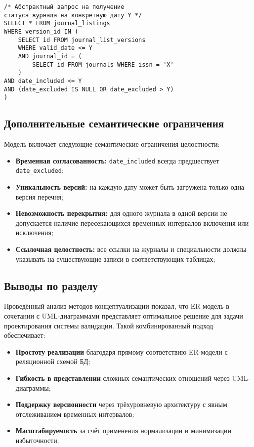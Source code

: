 \begin{verbatim}
/* Абстрактный запрос на получение 
статуса журнала на конкретную дату Y */
SELECT * FROM journal_listings
WHERE version_id IN (
    SELECT id FROM journal_list_versions
    WHERE valid_date <= Y
    AND journal_id = (
        SELECT id FROM journals WHERE issn = 'X'
    )
AND date_included <= Y
AND (date_excluded IS NULL OR date_excluded > Y)
)
\end{verbatim}

\subsection*{Дополнительные семантические ограничения}

Модель включает следующие семантические ограничения целостности:
\begin{itemize} 
	\item \textbf{Временная согласованность:} {\small\texttt{date\_included}} всегда предшествует {\small\texttt{date\_excluded}};
	\item \textbf{Уникальность версий:} на каждую дату может быть загружена только одна версия перечня;
	\item \textbf{Невозможность перекрытия:} для одного журнала в одной версии не допускается наличие пересекающихся временных интервалов включения или исключения;
	\item \textbf{Ссылочная целостность:} все ссылки на журналы и специальности должны указывать на существующие записи в соответствующих таблицах;
\end{itemize}

\subsection{Выводы по разделу}

Проведённый анализ методов концептуализации показал, что ER-модель в сочетании с
UML-диаграммами представляет оптимальное решение для задачи проектирования системы
валидации. Такой комбинированный подход обеспечивает:

\begin{itemize}
	\item \textbf{Простоту реализации} благодаря прямому соответствию ER-модели с реляционной схемой БД;
	\item \textbf{Гибкость в представлении} сложных семантических отношений через UML-диаграммы;
	\item \textbf{Поддержку версионности} через трёхуровневую архитектуру с явным отслеживанием временных интервалов;
	\item \textbf{Масштабируемость} за счёт применения нормализации и минимизации избыточности.
\end{itemize}

